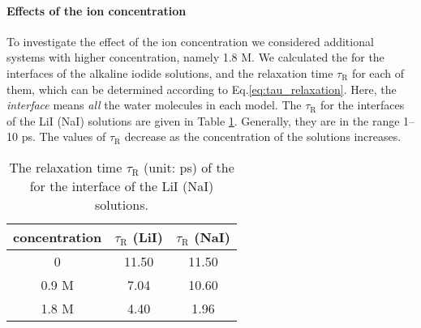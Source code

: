 \paragraph{Effects of the ion concentration}
To investigate the effect of the ion concentration we considered additional systems with higher concentration, namely 1.8 M.
We calculated the \CHB for the interfaces of the alkaline iodide solutions, 
and the relaxation time $\tau_{\text{R}}$ for each of them, which can be determined according to Eq.\thinspace\ref{eq:tau_relaxation}. 
Here, the \emph{interface} means \emph{all} the water molecules in each model. 
The $\tau_{\text{R}}$ for the interfaces of the LiI (NaI) solutions are given in 
Table \ref{tab:tau_hb}. Generally, they are in the range 1--10 ps. 
The values of $\tau_{\text{R}}$ decrease as the concentration of the solutions increases.
\begin{table}[htbp]
\centering
\caption{\label{tab:tau_hb} 
  The relaxation time $\tau_{\text{R}}$ (unit: ps) of the \CHB  for the interface of the LiI (NaI) solutions.}
\begin{tabular}{ccc}
  concentration  & $\tau_{\text{R}}$ (LiI) & $\tau_{\text{R}}$ (NaI) \\
\hline
  0 & 11.50 & 11.50 \\
  0.9 M & 7.04 & 10.60 \\
  1.8 M & 4.40 & 1.96 
\end{tabular}
\end{table}

